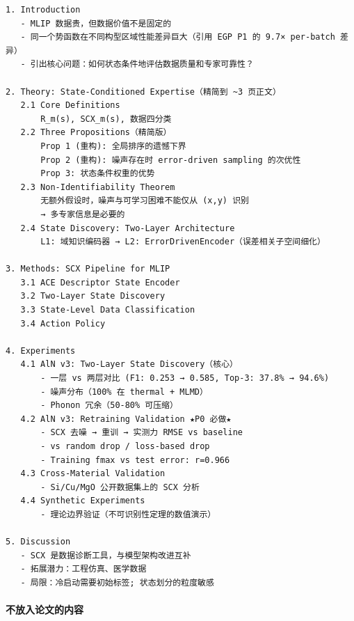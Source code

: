 \documentclass[
  12pt,
]{ctexart}
\begin{document}
\begin{verbatim}
1. Introduction
   - MLIP 数据贵，但数据价值不是固定的
   - 同一个势函数在不同构型区域性能差异巨大（引用 EGP P1 的 9.7× per-batch 差异）
   - 引出核心问题：如何状态条件地评估数据质量和专家可靠性？

2. Theory: State-Conditioned Expertise（精简到 ~3 页正文）
   2.1 Core Definitions
       R_m(s), SCX_m(s), 数据四分类
   2.2 Three Propositions（精简版）
       Prop 1 (重构): 全局排序的遗憾下界
       Prop 2 (重构): 噪声存在时 error-driven sampling 的次优性
       Prop 3: 状态条件权重的优势
   2.3 Non-Identifiability Theorem
       无额外假设时，噪声与可学习困难不能仅从 (x,y) 识别
       → 多专家信息是必要的
   2.4 State Discovery: Two-Layer Architecture
       L1: 域知识编码器 → L2: ErrorDrivenEncoder（误差相关子空间细化）

3. Methods: SCX Pipeline for MLIP
   3.1 ACE Descriptor State Encoder
   3.2 Two-Layer State Discovery
   3.3 State-Level Data Classification
   3.4 Action Policy

4. Experiments
   4.1 AlN v3: Two-Layer State Discovery（核心）
       - 一层 vs 两层对比 (F1: 0.253 → 0.585, Top-3: 37.8% → 94.6%)
       - 噪声分布（100% 在 thermal + MLMD）
       - Phonon 冗余（50-80% 可压缩）
   4.2 AlN v3: Retraining Validation ★P0 必做★
       - SCX 去噪 → 重训 → 实测力 RMSE vs baseline
       - vs random drop / loss-based drop
       - Training fmax vs test error: r=0.966
   4.3 Cross-Material Validation
       - Si/Cu/MgO 公开数据集上的 SCX 分析
   4.4 Synthetic Experiments
       - 理论边界验证（不可识别性定理的数值演示）

5. Discussion
   - SCX 是数据诊断工具，与模型架构改进互补
   - 拓展潜力：工程仿真、医学数据
   - 局限：冷启动需要初始标签; 状态划分的粒度敏感
\end{verbatim}

\paragraph{不放入论文的内容}\label{ux4e0dux653eux5165ux8bbaux6587ux7684ux5185ux5bb9}
\end{document}
